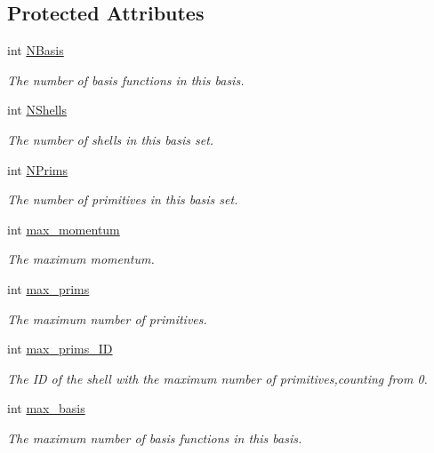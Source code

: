 \subsection*{Protected Attributes}
\begin{DoxyCompactItemize}
\item 
int \hyperlink{classJKBuilder_1_1BasisSet_a41e2bc1e52da2859eabe6586e4451663}{NBasis}
\begin{DoxyCompactList}\small\item\em The number of basis functions in this basis. \item\end{DoxyCompactList}\item 
int \hyperlink{classJKBuilder_1_1BasisSet_a9f13901f058284051a35aabd9d69c6d5}{NShells}
\begin{DoxyCompactList}\small\item\em The number of shells in this basis set. \item\end{DoxyCompactList}\item 
int \hyperlink{classJKBuilder_1_1BasisSet_ad30990632a28f27018d2b497e263caf1}{NPrims}
\begin{DoxyCompactList}\small\item\em The number of primitives in this basis set. \item\end{DoxyCompactList}\item 
int \hyperlink{classJKBuilder_1_1BasisSet_a8fce14d0246c865eea79bf2869b02997}{max\_\-momentum}
\begin{DoxyCompactList}\small\item\em The maximum momentum. \item\end{DoxyCompactList}\item 
int \hyperlink{classJKBuilder_1_1BasisSet_aeb188680b23f4d32ea9a65468e5ba71d}{max\_\-prims}
\begin{DoxyCompactList}\small\item\em The maximum number of primitives. \item\end{DoxyCompactList}\item 
int \hyperlink{classJKBuilder_1_1BasisSet_acdabb925780e7292114dfa2ace8b9d8e}{max\_\-prims\_\-ID}
\begin{DoxyCompactList}\small\item\em The ID of the shell with the maximum number of primitives,counting from 0. \item\end{DoxyCompactList}\item 
int \hyperlink{classJKBuilder_1_1BasisSet_af29e85e56ea63952fc7a1ede8d10426f}{max\_\-basis}
\begin{DoxyCompactList}\small\item\em The maximum number of basis functions in this basis. \item\end{DoxyCompactList}\end{DoxyCompactItemize}
